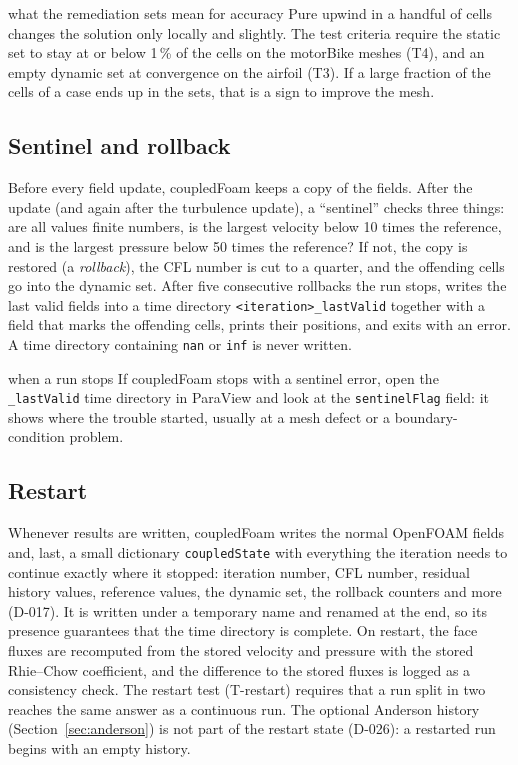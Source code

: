 \documentclass[11pt,a4paper]{article}
\newcommand{\code}[1]{\texttt{#1}}
\begin{document}
\begin{whyitmatters}{what the remediation sets mean for accuracy}
  Pure upwind in a handful of cells changes the solution only locally and
  slightly. The test criteria require the static set to stay at or below
  1\,\% of the cells on the motorBike meshes (T4), and an empty dynamic set
  at convergence on the airfoil (T3). If a large fraction of the cells of
  a case ends up in the sets, that is a sign to improve the mesh.
\end{whyitmatters}

\subsection{Sentinel and rollback}\label{sec:sentinel}

Before every field update, coupledFoam keeps a copy of the fields. After
the update (and again after the turbulence update), a ``sentinel'' checks
three things: are all values finite numbers, is the largest velocity below
10 times the reference, and is the largest pressure below 50 times the
reference? If not, the copy is restored (a \emph{rollback}), the CFL number
is cut to a quarter, and the offending cells go into the dynamic set. After
five consecutive rollbacks the run stops, writes the last valid fields into
a time directory \code{<iteration>\_lastValid} together with a field that
marks the offending cells, prints their positions, and exits with an error.
A time directory containing \code{nan} or \code{inf} is never written.

\begin{whyitmatters}{when a run stops}
  If coupledFoam stops with a sentinel error, open the \code{\_lastValid}
  time directory in ParaView and look at the \code{sentinelFlag} field: it
  shows where the trouble started, usually at a mesh defect or a
  boundary-condition problem.
\end{whyitmatters}

\subsection{Restart}\label{sec:restart}

Whenever results are written, coupledFoam writes the normal OpenFOAM fields
and, last, a small dictionary \code{coupledState} with everything the
iteration needs to continue exactly where it stopped: iteration number, CFL
number, residual history values, reference values, the dynamic set, the
rollback counters and more (D-017). It is written under a temporary name and
renamed at the end, so its presence guarantees that the time directory is
complete. On restart, the face fluxes are recomputed from the stored
velocity and pressure with the stored Rhie--Chow coefficient, and the
difference to the stored fluxes is logged as a consistency check. The
restart test (T-restart) requires that a run split in two reaches the same
answer as a continuous run. The optional Anderson history
(Section~\ref{sec:anderson}) is not part of the restart state (D-026): a
restarted run begins with an empty history.
\end{document}
